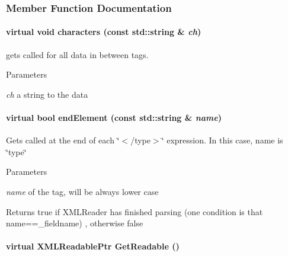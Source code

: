 \subsubsection{Member Function Documentation}
\hypertarget{classOpenRAVE_1_1BaseXMLReader_a0b124434353fd2e48d951c2053e63408}{
\paragraph[{characters}]{\setlength{\rightskip}{0pt plus 5cm}virtual void characters (const std::string \& {\em ch})}\hfill}
\label{classOpenRAVE_1_1BaseXMLReader_a0b124434353fd2e48d951c2053e63408}
gets called for all data in between tags. 
\begin{DoxyParams}{Parameters}
\item[{\em ch}]a string to the data \end{DoxyParams}
\hypertarget{classOpenRAVE_1_1BaseXMLReader_a3b5c1a1dc1e0965a9e27f139b18db4d9}{
\paragraph[{endElement}]{\setlength{\rightskip}{0pt plus 5cm}virtual bool endElement (const std::string \& {\em name})}\hfill}
\label{classOpenRAVE_1_1BaseXMLReader_a3b5c1a1dc1e0965a9e27f139b18db4d9}
Gets called at the end of each \char`\"{}$<$/type$>$\char`\"{} expression. In this case, name is \char`\"{}type\char`\"{} 
\begin{DoxyParams}{Parameters}
\item[{\em name}]of the tag, will be always lower case \end{DoxyParams}
\begin{DoxyReturn}{Returns}
true if XMLReader has finished parsing (one condition is that name==\_\-fieldname) , otherwise false 
\end{DoxyReturn}
\hypertarget{classOpenRAVE_1_1BaseXMLReader_a96a8303765bddf9742cbc422f8a9c2d6}{
\paragraph[{GetReadable}]{\setlength{\rightskip}{0pt plus 5cm}virtual XMLReadablePtr GetReadable ()}\hfill}
